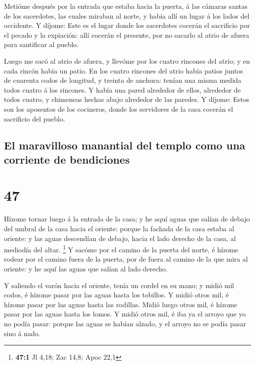  Metióme después por la entrada que estaba hacia la puerta,
á las cámaras santas de los sacerdotes, las cuales miraban al norte, y
había allí un lugar á los lados del occidente.  Y díjome:
Este es el lugar donde los sacerdotes cocerán el sacrificio por el
pecado y la expiación: allí cocerán el presente, por no sacarlo al atrio
de afuera para santificar al pueblo.

 Luego me sacó al atrio de afuera, y llevóme por los cuatro
rincones del atrio; y en cada rincón había un patio.  En
los cuatro rincones del atrio había patios juntos de cuarenta codos de
longitud, y treinta de anchura: tenían una misma medida todos cuatro á
los rincones.  Y había una pared alrededor de ellos,
alrededor de todos cuatro, y chimeneas hechas abajo alrededor de las
paredes.  Y díjome: Estos son los aposentos de los
cocineros, donde los servidores de la casa cocerán el sacrificio del
pueblo.

\hypertarget{el-maravilloso-manantial-del-templo-como-una-corriente-de-bendiciones}{%
\subsection{El maravilloso manantial del templo como una corriente de
bendiciones}\label{el-maravilloso-manantial-del-templo-como-una-corriente-de-bendiciones}}

\hypertarget{section-46}{%
\section{47}\label{section-46}}

 Hízome tornar luego á la entrada de la casa; y he aquí
aguas que salían de debajo del umbral de la casa hacia el oriente:
porque la fachada de la casa estaba al oriente: y las aguas descendían
de debajo, hacia el lado derecho de la casa, al mediodía del altar.
\footnote{\textbf{47:1} Jl 4,18; Zac 14,8; Apoc 22,1}  Y
sacóme por el camino de la puerta del norte, é hízome rodear por el
camino fuera de la puerta, por de fuera al camino de la que mira al
oriente: y he aquí las aguas que salían al lado derecho.

 Y saliendo el varón hacia el oriente, tenía un cordel en su
mano; y midió mil codos, é hízome pasar por las aguas hasta los
tobillos.  Y midió otros mil, é hízome pasar por las aguas
hasta las rodillas. Midió luego otros mil, é hízome pasar por las aguas
hasta los lomos.  Y midió otros mil, é iba ya el arroyo que
yo no podía pasar: porque las aguas se habían alzado, y el arroyo no se
podía pasar sino á nado.

